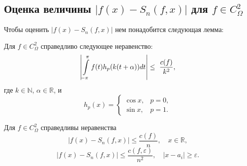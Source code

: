 \subsection{Оценка величины $\left|f(x)-S_{n}(f,x)\right|$ для $f \in C^{2}_\Omega$}
Чтобы оценить $\left|f(x)-S_{n}(f,x)\right|$ нем понадобится следующая лемма:
\begin{lemma} \label{l_int_estimate}
	Для $f \in C_\Omega^2$ справедливо следующее неравенство:
	\begin{equation*}
	\left|\intop_{-\pi}^{\pi}f(t)h_{p}(k(t+\alpha))dt\right|\leq\ \frac{c(f)}{k^{2}},
	\end{equation*}
	где $k \in \mathbb{N}$, $\alpha \in \mathbb{R}$, и
	\begin{equation} \label{h_func_introduction}
	h_{p}(x)=\begin{cases}
	\cos x, & p=0,\\
	\sin x, & p=1.
	\end{cases}
	\end{equation}
\end{lemma}
\begin{lemma}
	Для $f \in C^2_\Omega$ справедливы неравенства
	\begin{equation}
	\left|f(x)-S_{n}(f,x)\right|\leq\frac{c(f)}{n},\quad x\in\mathbb{R},\label{eq:fSn_est1}
	\end{equation}
	\begin{equation}
	\left|f(x)-S_{n}(f,x)\right|\leq\frac{c(f,\varepsilon)}{n^{2}},\quad\left|x-a_{i}\right|\geq\varepsilon.\label{eq:fSn_est2}
	\end{equation}
\end{lemma}
